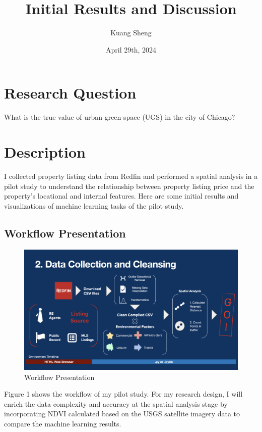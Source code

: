 \documentclass{article}
\title{Initial Results and Discussion}
\author{Kuang Sheng}
\date{April 29th, 2024}
\begin{document}
\maketitle

\section*{Research Question}
What is the true value of urban green space (UGS) in the city of Chicago?

\section*{Description}
I collected property listing data from Redfin and performed a spatial analysis in a pilot study to understand the relationship between property listing price and the property’s locational and internal features. Here are some initial results and visualizations of machine learning tasks of the pilot study.

\subsection*{Workflow Presentation}
\begin{figure}[h]
  \centering
  \includegraphics[width=\textwidth]{Visual/workflow.jpeg}
  \caption{Workflow Presentation}
\end{figure}

Figure 1 shows the workflow of my pilot study. For my research design, I will enrich the data complexity and accuracy at the spatial analysis stage by incorporating NDVI calculated based on the USGS satellite imagery data to compare the machine learning results.
\end{document}

